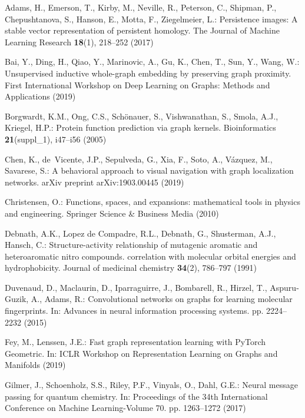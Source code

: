 \documentclass[runningheads]{llncs}
\begin{document}
\begin{thebibliography}{10}
\providecommand{\url}[1]{\texttt{#1}}
\providecommand{\urlprefix}{URL }
\providecommand{\doi}[1]{https://doi.org/#1}

Adams, H., Emerson, T., Kirby, M., Neville, R., Peterson, C., Shipman, P.,
  Chepushtanova, S., Hanson, E., Motta, F., Ziegelmeier, L.: Persistence
  images: A stable vector representation of persistent homology. The Journal of
  Machine Learning Research  \textbf{18}(1),  218--252 (2017)

Bai, Y., Ding, H., Qiao, Y., Marinovic, A., Gu, K., Chen, T., Sun, Y., Wang,
  W.: Unsupervised inductive whole-graph embedding by preserving graph
  proximity. First International Workshop on Deep Learning on Graphs: Methods
  and Applications  (2019)

Borgwardt, K.M., Ong, C.S., Sch{\"o}nauer, S., Vishwanathan, S., Smola, A.J.,
  Kriegel, H.P.: Protein function prediction via graph kernels. Bioinformatics
  \textbf{21}(suppl\_1),  i47--i56 (2005)

Chen, K., de~Vicente, J.P., Sepulveda, G., Xia, F., Soto, A., V{\'a}zquez, M.,
  Savarese, S.: A behavioral approach to visual navigation with graph
  localization networks. arXiv preprint arXiv:1903.00445  (2019)

Christensen, O.: Functions, spaces, and expansions: mathematical tools in
  physics and engineering. Springer Science \& Business Media (2010)

Debnath, A.K., {Lopez de Compadre}, R.L., Debnath, G., Shusterman, A.J.,
  Hansch, C.: Structure-activity relationship of mutagenic aromatic and
  heteroaromatic nitro compounds. correlation with molecular orbital energies
  and hydrophobicity. Journal of medicinal chemistry  \textbf{34}(2),  786--797
  (1991)

Duvenaud, D., Maclaurin, D., Iparraguirre, J., Bombarell, R., Hirzel, T.,
  Aspuru-Guzik, A., Adams, R.: Convolutional networks on graphs for learning
  molecular fingerprints. In: Advances in neural information processing
  systems. pp. 2224--2232 (2015)

Fey, M., Lenssen, J.E.: Fast graph representation learning with {PyTorch
  Geometric}. In: ICLR Workshop on Representation Learning on Graphs and
  Manifolds (2019)

Gilmer, J., Schoenholz, S.S., Riley, P.F., Vinyals, O., Dahl, G.E.: Neural
  message passing for quantum chemistry. In: Proceedings of the 34th
  International Conference on Machine Learning-Volume 70. pp. 1263--1272 (2017)


\end{thebibliography}
\end{document}
